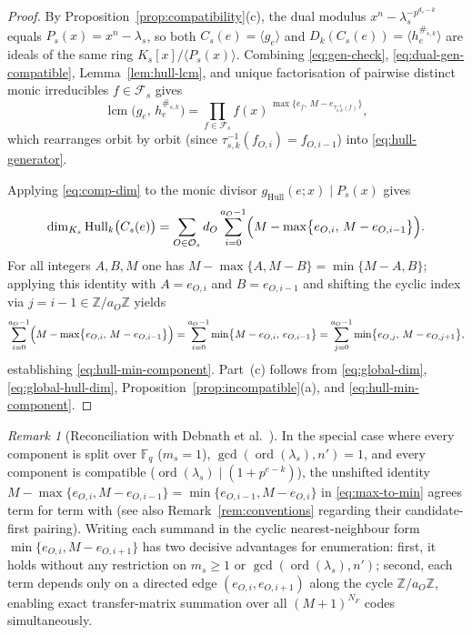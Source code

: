 \documentclass[preprint,12pt]{elsarticle}
\newcommand{\F}{\mathbb F}
\newcommand{\Z}{\mathbb Z}
\newcommand{\Fs}{\mathcal F_s}
\newcommand{\Os}{\mathcal O_s}
\newcommand{\Hull}{\operatorname{Hull}}
\newcommand{\ord}{\operatorname{ord}}
\newcommand{\lcm}{\operatorname{lcm}}
\newcommand{\Dk}{D_k}
\numberwithin{equation}{section}
\theoremstyle{plain}
\theoremstyle{definition}
\theoremstyle{remark}
\newtheorem{remark}[theorem]{Remark}
\begin{document}
\begin{proof}
By Proposition~\ref{prop:compatibility}\textup{(c)}, the dual modulus
$x^n-\lambda_s^{-p^{d_s-k}}$ equals $P_s(x)=x^n-\lambda_s$, so both
$C_s(e)=\langle g_e\rangle$ and $\Dk(C_s(e))=\langle h_e^{\#_{s,k}}\rangle$ are
ideals of the same ring $K_s[x]/\langle P_s(x)\rangle$. Combining
\eqref{eq:gen-check}, \eqref{eq:dual-gen-compatible}, Lemma~\ref{lem:hull-lcm},
and unique factorisation of pairwise distinct monic irreducibles $f\in\Fs$ gives
\[
\lcm\bigl(g_e,\,h_e^{\#_{s,k}}\bigr)
 =\prod_{f\in\Fs} f(x)^{\,\max\{e_f,\,M-e_{\tau_{s,k}^{-1}(f)}\}},
\]
which rearranges orbit by orbit (since $\tau_{s,k}^{-1}(f_{O,i})=f_{O,i-1}$) into
\eqref{eq:hull-generator}.

Applying \eqref{eq:comp-dim} to the monic divisor $g_{\Hull}(e;x)\mid P_s(x)$
gives
\[
\dim_{K_s}\Hull_k\bigl(C_s(e)\bigr)
 =\sum_{O\in\Os} d_O\sum_{i=0}^{a_O-1}
   \Bigl(M-\max\bigl\{e_{O,i},\,M-e_{O,i-1}\bigr\}\Bigr).
\]
For all integers $A,B,M$ one has $M-\max\{A,M-B\}=\min\{M-A,B\}$; applying this
identity with $A=e_{O,i}$ and $B=e_{O,i-1}$ and shifting the cyclic index via
$j=i-1\in\Z/a_O\Z$ yields
\begin{equation}\label{eq:max-to-min}
\sum_{i=0}^{a_O-1}\Bigl(M-\max\bigl\{e_{O,i},\,M-e_{O,i-1}\bigr\}\Bigr)
 =\sum_{i=0}^{a_O-1}\min\bigl\{M-e_{O,i},\,e_{O,i-1}\bigr\}
 =\sum_{j=0}^{a_O-1}\min\bigl\{e_{O,j},\,M-e_{O,j+1}\bigr\},
\end{equation}
establishing \eqref{eq:hull-min-component}. Part~\textup{(c)} follows from
\eqref{eq:global-dim}, \eqref{eq:global-hull-dim},
Proposition~\ref{prop:incompatible}\textup{(a)}, and \eqref{eq:hull-min-component}.
\end{proof}

\begin{remark}[Reconciliation with Debnath et al.\ {\cite[Theorem~8]{debnathAffine2026}}]\label{rem:debnath-hull}
In the special case where every component is split over $\F_q$ ($m_s=1$),
$\gcd(\ord(\lambda_s),n')=1$, and every component is compatible
($\ord(\lambda_s)\mid(1+p^{e-k})$), the unshifted identity
$M-\max\{e_{O,i},M-e_{O,i-1}\}=\min\{e_{O,i-1},M-e_{O,i}\}$ in
\eqref{eq:max-to-min} agrees term for term with \cite[Theorem~8]{debnathAffine2026}
(see also Remark~\ref{rem:conventions} regarding their candidate-first pairing).
Writing each summand in the cyclic nearest-neighbour form
$\min\{e_{O,i},M-e_{O,i+1}\}$ has two decisive advantages for enumeration: first,
it holds without any restriction on $m_s\ge 1$ or $\gcd(\ord(\lambda_s),n')$;
second, each term depends only on a directed edge $(e_{O,i},e_{O,i+1})$ along the
cycle $\Z/a_O\Z$, enabling exact transfer-matrix summation over all
$(M+1)^{N_F}$ codes simultaneously.
\end{remark}
\end{document}
